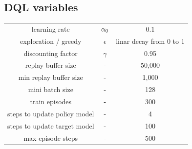 \documentclass{article}
\begin{document}
\subsection{DQL variables}

\begin{tabular}{ c c c }
  learning rate & $\alpha\textsubscript{0}$ & 0.1 \\
  exploration / greedy & $\epsilon$ & linar decay from 0 to 1 \\
  discounting factor & $\gamma$ & 0.95 \\  
  replay buffer size & - & 50,000 \\
  min replay buffer size & - & 1,000 \\
  mini batch size & - & 128 \\
  train episodes & - & 300 \\
  steps to update policy model & - & 4 \\
  steps to update target model & - & 100  \\
  max episode steps & - & 500
 \end{tabular}
\end{document}
